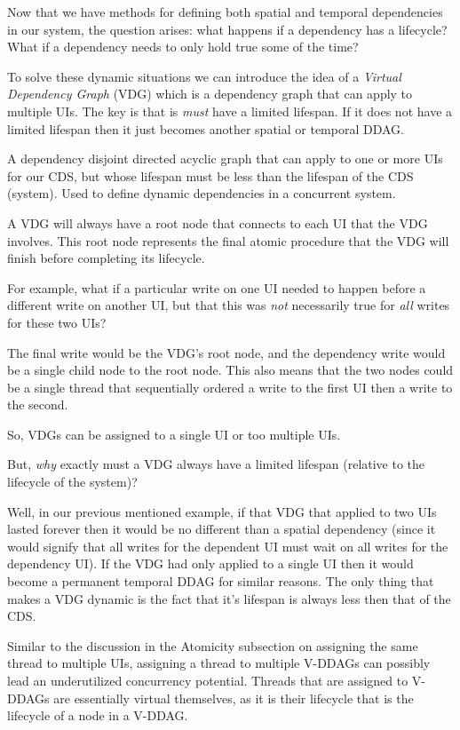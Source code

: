Now that we have methods for defining both spatial and temporal dependencies in our system, the question arises: what happens if a dependency has a lifecycle? What if a dependency needs to only hold true some of the time?

To solve these dynamic situations we can introduce the idea of a \textit{Virtual Dependency Graph} (VDG) which is a dependency graph that can apply to multiple UIs. The key is that is \textit{must} have a limited lifespan. If it does not have a limited lifespan then it just becomes another spatial or temporal DDAG.

\begin{con-def}
	\label{thread}
	A dependency disjoint directed acyclic graph that can apply to one or more UIs for our CDS, but whose lifespan must be less than the lifespan of the CDS (system). Used to define dynamic dependencies in a concurrent system.
\end{con-def}

A VDG will always have a root node that connects to each UI that the VDG involves. This root node represents the final atomic procedure that the VDG will finish before completing its lifecycle.

For example, what if a particular write on one UI needed to happen before a different write on another UI, but that this was \textit{not} necessarily true for \textit{all} writes for these two UIs?

The final write would be the VDG's root node, and the dependency write would be a single child node to the root node. This also means that the two nodes could be a single thread that sequentially ordered a write to the first UI then a write to the second.

So, VDGs can be assigned to a single UI or too multiple UIs.

But, \textit{why} exactly must a VDG always have a limited lifespan (relative to the lifecycle of the system)? 

Well, in our previous mentioned example, if that VDG that applied to two UIs lasted forever then it would be no different than a spatial dependency (since it would signify that all writes for the dependent UI must wait on all writes for the dependency UI). If the VDG had only applied to a single UI then it would become a permanent temporal DDAG for similar reasons. The only thing that makes a VDG dynamic is the fact that it's lifespan is always less then that of the CDS.

Similar to the discussion in the Atomicity subsection on assigning the same thread to multiple UIs, assigning a thread to multiple V-DDAGs can possibly lead an underutilized concurrency potential. Threads that are assigned to V-DDAGs are essentially virtual themselves, as it is their lifecycle that is the lifecycle of a node in a V-DDAG.

